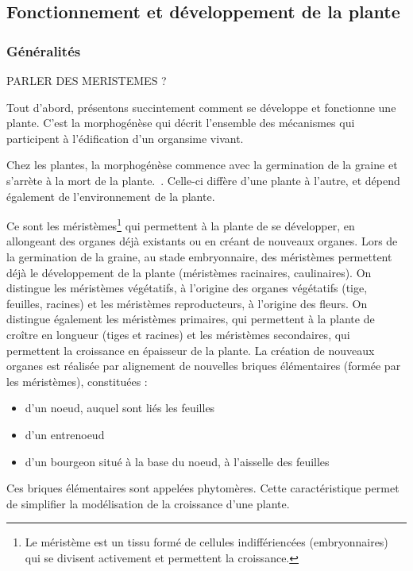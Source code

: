 \subsection{Fonctionnement et développement de la plante}

\subsubsection{Généralités}

PARLER DES MERISTEMES ?

Tout d'abord, présentons succintement comment se développe et fonctionne une plante. 
C'est la morphogénèse qui décrit l'ensemble des mécanismes qui participent à l'édification d'un organsime vivant.

Chez les plantes, la morphogénèse commence avec la germination de la graine et s'arrète à la mort de la plante.~\cite[p.~22]{these_modelisation}.
Celle-ci diffère d'une plante à l'autre, et dépend également de l'environnement de la plante.

Ce sont les méristèmes\footnote{Le méristème est un tissu formé de cellules indiffériencées (embryonnaires) qui se divisent activement et permettent la croissance.} qui permettent à la plante de se développer, en allongeant des organes déjà existants ou en créant de nouveaux organes.
Lors de la germination de la graine, au stade embryonnaire, des méristèmes permettent déjà le développement de la plante (méristèmes racinaires, caulinaires).
On distingue les méristèmes végétatifs, à l’origine des organes végétatifs (tige, feuilles, racines) et les méristèmes reproducteurs, à l’origine des fleurs.
On distingue également les méristèmes primaires, qui permettent à la plante de croître en longueur (tiges et racines) et les méristèmes secondaires, qui permettent la croissance en épaisseur de la plante.
La création de nouveaux organes est réalisée par alignement de nouvelles briques élémentaires (formée par les méristèmes), constituées :
\begin{itemize}
	\item d'un noeud, auquel sont liés les feuilles
	\item d'un entrenoeud 
	\item d'un bourgeon situé à la base du noeud, à l'aisselle des feuilles
\end{itemize} 

Ces briques élémentaires sont appelées phytomères. Cette caractéristique permet de simplifier la modélisation de la croissance d'une plante.



